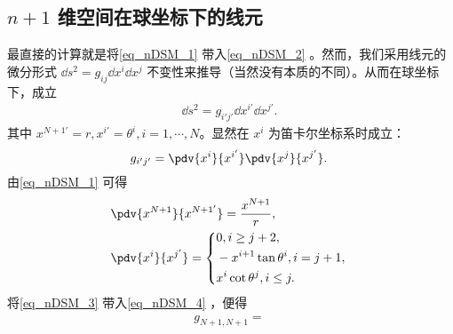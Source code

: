 \subsection{$n+1$ 维空间在球坐标下的线元}
最直接的计算就是将\autoref{eq_nDSM_1} 带入\autoref{eq_nDSM_2} 。然而，我们采用线元的微分形式 $\dd s^2=g_{ij}\dd x^i\dd x^j$ 不变性来推导（当然没有本质的不同）。从而在球坐标下，成立
\begin{equation}
\begin{aligned}
\dd s^2= g_{i'j'}\dd x^{i'}\dd x^{j'}.
\end{aligned}~
\end{equation}
其中 $x^{N+1'}=r,x^{i'}=\theta^i,i=1,\cdots,N$。显然在 $x^i$ 为笛卡尔坐标系时成立：
\begin{equation}\label{eq_nDSM_4}
g_{i'j'}=\pdv{x^i}{x^{i'}}\pdv{x^j}{x^{j'}}.~
\end{equation}
由\autoref{eq_nDSM_1} 可得
\begin{equation}\label{eq_nDSM_3}
\begin{aligned}
&\pdv{x^{N+1}}{x^{N+1'}}=\frac{x^{N+1}}{r},\\
&\pdv{x^{i}}{x^{j'}}=\left\{\begin{aligned}
&0,i\geq j+2,\\
&-x^{i+1}\tan\theta^i,i=j+1,\\
&x^i\cot\theta^j,i\leq j.
\end{aligned}\right.
\end{aligned}~
\end{equation}
将\autoref{eq_nDSM_3} 带入\autoref{eq_nDSM_4} ，便得
\begin{equation}
\begin{aligned}
g_{N+1,N+1}=
\end{aligned}~
\end{equation}




























